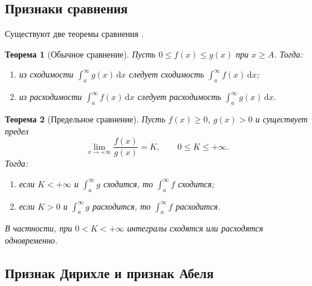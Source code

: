 \documentclass[coursework, och, times]{SCWorks1}
\newtheorem{theorem}{Теорема}
\newcommand{\dd}{\,\mathrm{d}}
\renewcommand{\le}{\leqslant}
\renewcommand{\ge}{\geqslant}
\begin{document}
\subsection{Признаки сравнения}
Существуют две теоремы сравнения \cite{ilin2}. 
\begin{theorem}[Обычное сравнение]
Пусть \(0\le f(x)\le g(x)\) при \(x\ge A\). Тогда:
\begin{enumerate}
\item из сходимости \(\int_a^\infty g(x)\dd x\) следует сходимость \(\int_a^\infty f(x)\dd x\);
\item из расходимости \(\int_a^\infty f(x)\dd x\) следует расходимость \(\int_a^\infty g(x)\dd x\).
\end{enumerate}
\end{theorem}

\begin{theorem}[Предельное сравнение]
Пусть \(f(x)\ge0\), \(g(x)>0\) и существует предел
\[
\lim_{x\to+\infty}\frac{f(x)}{g(x)}=K,\qquad 0\le K\le+\infty.
\]
Тогда:
\begin{enumerate}
\item если \(K<+\infty\) и \(\int_a^\infty g\) сходится, то \(\int_a^\infty f\) сходится;
\item если \(K>0\) и \(\int_a^\infty g\) расходится, то \(\int_a^\infty f\) расходится.
\end{enumerate}
В частности, при \(0<K<+\infty\) интегралы сходятся или расходятся одновременно.
\end{theorem}

\subsection{Признак Дирихле и признак Абеля}
\end{document}
